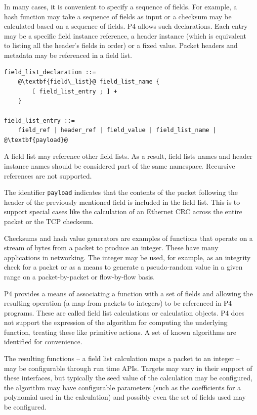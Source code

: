\documentclass[12pt]{article}
\begin{document}

In many cases, it is convenient to specify a sequence of fields. For example, 
a hash function may take a sequence of fields as input or a checksum may be 
calculated based on a sequence of fields.  P4 allows such declarations. Each 
entry may be a specific field instance reference, a header instance (which 
is equivalent to listing all the header's fields in order) or a fixed value. 
Packet headers and metadata may be referenced in a field list.

\begin{lstlisting}[frame=single,backgroundcolor=\color{bnfgreen},escapechar=\@]
field_list_declaration ::=
    @\textbf{field\_list}@ field_list_name {
        [ field_list_entry ; ] +
    }

field_list_entry ::= 
    field_ref | header_ref | field_value | field_list_name | @\textbf{payload}@
\end{lstlisting}


A field list may reference other field lists. As a result, field lists names 
and header instance names should be considered part of the same namespace. 
Recursive references are not supported.

The identifier \texttt{payload} indicates that the contents of the
packet following the header of the previously mentioned field is
included in the field list.  This is to support special cases like the
calculation of an Ethernet CRC across the entire packet or the TCP
checksum.


Checksums and hash value generators are examples of functions that operate on a
stream of bytes from a packet to produce an integer. These have many
applications in networking. The integer may be used, for example, as an
integrity check for a packet or as a means to generate a pseudo-random value in
a given range on a packet-by-packet or flow-by-flow basis.

P4 provides a means of associating a function with a set of fields and
allowing the resulting operation (a map from packets to integers) to
be referenced in P4 programs.  These are called field list
calculations or calculation objects.  P4 does not support the
expression of the algorithm for computing the underlying function,
treating these like primitive actions. A set of known algorithms are
identified for convenience.

The resulting functions -- a field list calculation maps a packet to
an integer -- may be configurable through run time APIs. Targets may
vary in their support of these interfaces, but typically the seed
value of the calculation may be configured, the algorithm may have
configurable parameters (such as the coefficients for a polynomial
used in the calculation) and possibly even the set of fields used may
be configured.
\end{document}
